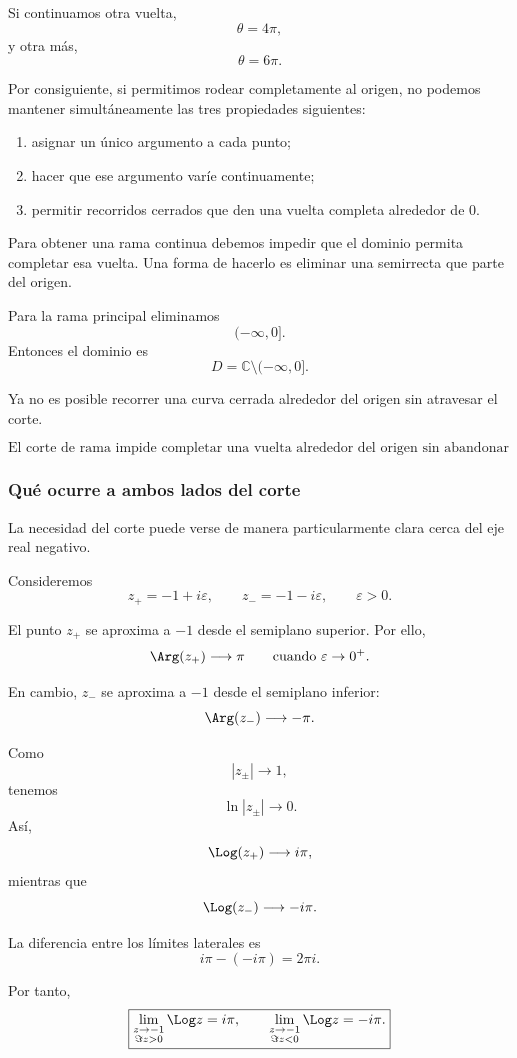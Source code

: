 \documentclass[12pt]{article}
\theoremstyle{definition}
\theoremstyle{remark}
\begin{document}
Si continuamos otra vuelta,
\[
\theta=4\pi,
\]
y otra más,
\[
\theta=6\pi.
\]

Por consiguiente, si permitimos rodear completamente al origen, no podemos
mantener simultáneamente las tres propiedades siguientes:

\begin{enumerate}
\item asignar un único argumento a cada punto;
\item hacer que ese argumento varíe continuamente;
\item permitir recorridos cerrados que den una vuelta completa alrededor de
$0$.
\end{enumerate}

Para obtener una rama continua debemos impedir que el dominio permita completar
esa vuelta. Una forma de hacerlo es eliminar una semirrecta que parte del
origen.

Para la rama principal eliminamos
\[
(-\infty,0].
\]
Entonces el dominio es
\[
D=\mathbb C\setminus(-\infty,0].
\]

Ya no es posible recorrer una curva cerrada alrededor del origen sin atravesar
el corte.

\[
\boxed{
\text{El corte de rama impide completar una vuelta alrededor del origen
sin abandonar el dominio.}
}
\]

\subsubsection{Qué ocurre a ambos lados del corte}

La necesidad del corte puede verse de manera particularmente clara cerca del
eje real negativo.

Consideremos
\[
z_+=-1+i\varepsilon,
\qquad
z_-=-1-i\varepsilon,
\qquad \varepsilon>0.
\]

El punto $z_+$ se aproxima a $-1$ desde el semiplano superior. Por ello,
\[
\Arg(z_+)\longrightarrow\pi
\qquad
\text{cuando }\varepsilon\to0^+.
\]

En cambio, $z_-$ se aproxima a $-1$ desde el semiplano inferior:
\[
\Arg(z_-)\longrightarrow-\pi.
\]

Como
\[
|z_\pm|\longrightarrow1,
\]
tenemos
\[
\ln|z_\pm|\longrightarrow0.
\]
Así,
\[
\Log(z_+)\longrightarrow i\pi,
\]
mientras que
\[
\Log(z_-)\longrightarrow-i\pi.
\]

La diferencia entre los límites laterales es
\[
i\pi-(-i\pi)=2\pi i.
\]

Por tanto,
\[
\boxed{
\lim_{\substack{z\to-1\\\Im z>0}}\Log z=i\pi,
\qquad
\lim_{\substack{z\to-1\\\Im z<0}}\Log z=-i\pi.
}
\]
\end{document}
